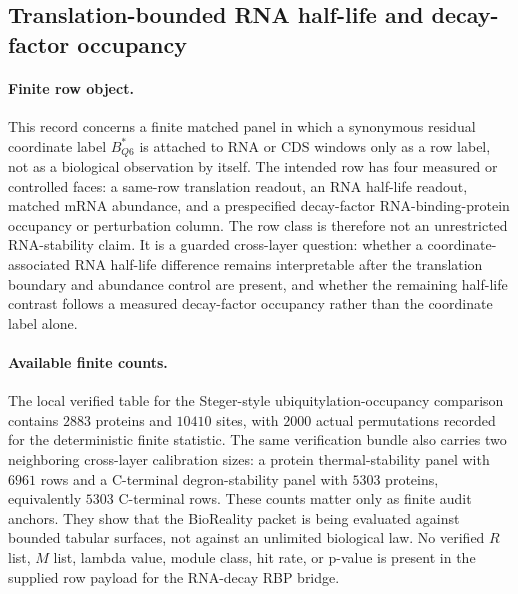 \subsection{Translation-bounded RNA half-life and decay-factor occupancy}
\label{sec:bioreality-q6-rna-decay-rbp-bridge-steger-occupancy}

\paragraph{Finite row object.}
This record concerns a finite matched panel in which a synonymous residual coordinate label $B^*_{Q6}$ is attached to RNA or CDS windows only as a row label, not as a biological observation by itself. The intended row has four measured or controlled faces: a same-row translation readout, an RNA half-life readout, matched mRNA abundance, and a prespecified decay-factor RNA-binding-protein occupancy or perturbation column. The row class is therefore not an unrestricted RNA-stability claim. It is a guarded cross-layer question: whether a coordinate-associated RNA half-life difference remains interpretable after the translation boundary and abundance control are present, and whether the remaining half-life contrast follows a measured decay-factor occupancy rather than the coordinate label alone.

\paragraph{Available finite counts.}
The local verified table for the Steger-style ubiquitylation-occupancy comparison contains $2883$ proteins and $10410$ sites, with $2000$ actual permutations recorded for the deterministic finite statistic. The same verification bundle also carries two neighboring cross-layer calibration sizes: a protein thermal-stability panel with $6961$ rows and a C-terminal degron-stability panel with $5303$ proteins, equivalently $5303$ C-terminal rows. These counts matter only as finite audit anchors. They show that the BioReality packet is being evaluated against bounded tabular surfaces, not against an unlimited biological law. No verified $R$ list, $M$ list, lambda value, module class, hit rate, or p-value is present in the supplied row payload for the RNA-decay RBP bridge.

